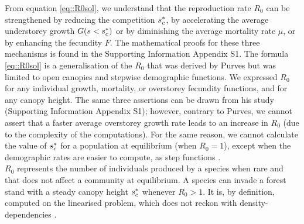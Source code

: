 From equation \eqref{eq::R0sol}, we understand that the reproduction rate $ R_0 $ can be strengthened by reducing the competition $ {s}^{*}_c $, by accelerating the average understorey growth $ G(s < {s}^{*}_c) $ or by diminishing the average mortality rate $ \mu $, or by enhancing the fecundity $ F $. The mathematical proofs for these three mechanisms is found in the Supporting Information Appendix S1. The formula \eqref{eq::R0sol} is a generalisation of the $ R_0 $ that was derived by Purves but was limited to open canopies and stepwise demographic functions. We expressed $ R_0 $ for any individual growth, mortality, or overstorey fecundity functions, and for any canopy height. The same three assertions can be drawn from his study (Supporting Information Appendix S1); however, contrary to Purves, we cannot assert that a faster average overstorey growth rate leads to an increase in $ R_0 $ (due to the complexity of the computations). For the same reason, we cannot calculate the value of $ {s}^{*}_c $ for a population at equilibrium (\ie when $ R_0 = 1 $), except when the demographic rates are easier to compute, as step functions \citep[Supporting Information Appendix S1 for the proof]{Purves2009}. \\

$ R_0 $ represents the number of individuals produced by a species when rare and that does not affect a community at equilibrium. A species can invade a forest stand with a steady canopy height $ {s}^{*}_c $ whenever $ R_0 > 1 $. It is, by definition, computed on the linearised problem, which does not reckon with density-dependencies \citep[in the introduction]{Diekmann1990}.


